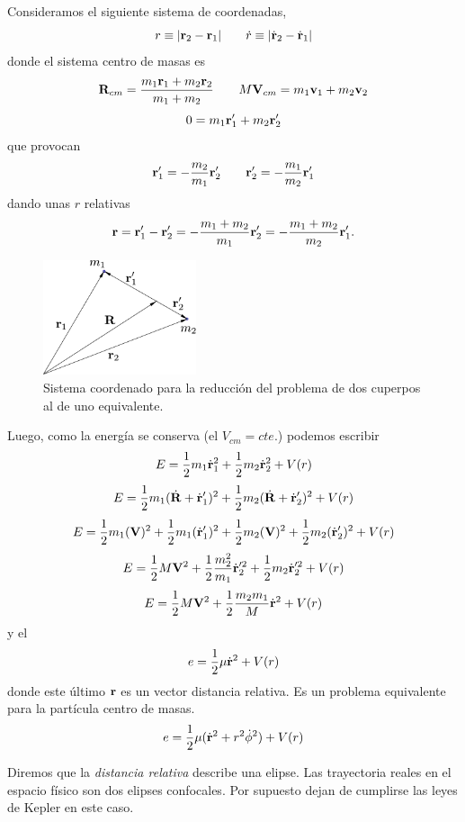 \documentclass[10pt,oneside]{CBFT_book}
\begin{document}
Consideramos el siguiente sistema de coordenadas,
\[
	r \equiv | \vb{r}_2 - \vb{r}_1 |	\qquad		 \dot{r} \equiv | \dot{\vb{r}}_2 - \dot{\vb{r}}_1 |
\]
donde el sistema centro de masas es
\[
	\vb{R}_{cm} = \frac{ m_1\vb{r}_1 + m_2\vb{r}_2 }{ m_1 + m_2 }	\qquad 
	M \vb{V}_{cm} =  m_1\vb{v}_1 + m_2\vb{v}_2 
\]
\[
	0 = m_1\vb{r}_1' + m_2\vb{r}_2'
\]
que provocan
\[
	\vb{r}_1' = -\frac{m_2}{m_1}\vb{r}_2' \qquad   \vb{r}_2' = -\frac{m_1}{m_2}\vb{r}_1' 
\]
dando unas $r$ relativas
\[
	\vb{r} = \vb{r}_1' - \vb{r}_2' = -\frac{ m_1 + m_2 }{ m_1 } \vb{r}_2' = -\frac{ m_1 + m_2 }{ m_2 } \vb{r}_1'.
\]

\begin{figure}
	\begin{center}
	\includegraphics[width=0.4\textwidth]{images/fig_reduccion.pdf}	 
	\end{center}
	\caption{Sistema coordenado para la reducción del problema de dos cuperpos al de uno equivalente.}
\end{figure} 

Luego, como la energía se conserva (el $V_{cm}=cte.$) podemos escribir
\[
	E = \frac{1}{2} m_1 \dot{\vb{r}}_1^2 + \frac{1}{2} m_2 \dot{\vb{r}}_2^2 + V(r)
\]
\[
	E = \frac{1}{2} m_1 ( \dot{\vb{R}} + \dot{\vb{r}}_1' )^2 + \frac{1}{2} m_2 ( \dot{\vb{R}} + \dot{\vb{r}}_2' )^2 + V(r)
\]
\[
	E = \frac{1}{2} m_1 ( {\vb{V}} )^2 +  \frac{1}{2} m_1 ( \dot{\vb{r}}_1' )^2 + 
		\frac{1}{2} m_2 ( {\vb{V}})^2 + \frac{1}{2} m_2 (\dot{\vb{r}}_2' )^2 + V(r)
\]
\[
	E = \frac{1}{2} M {\vb{V}}^2 + \frac{1}{2} \frac{m_2^2}{m_1} \dot{\vb{r}}_2'^2 + \frac{1}{2} m_2 \dot{\vb{r}}_2'^2 + V(r)
\]
\[
	E = \frac{1}{2} M {\vb{V}}^2 + \frac{1}{2} \frac{m_2 m_1}{M} \dot{\vb{r}}^2 + V(r)
\]
y el 
\[
	e = \frac{1}{2} \mu \dot{\vb{r}}^2 + V(r)
\]
donde este último $\vb{r}$ es un vector distancia relativa. Es un problema equivalente para la partícula
centro de masas.
\[
	e = \frac{1}{2} \mu ( \dot{\vb{r}}^2 + r^2\dot{\phi}^2 ) + V(r)
\]

Diremos que la {\it distancia relativa} describe una elipse. Las trayectoria reales en el espacio físico
son dos elipses confocales. Por supuesto dejan de cumplirse las leyes de Kepler en este caso.
\end{document}
